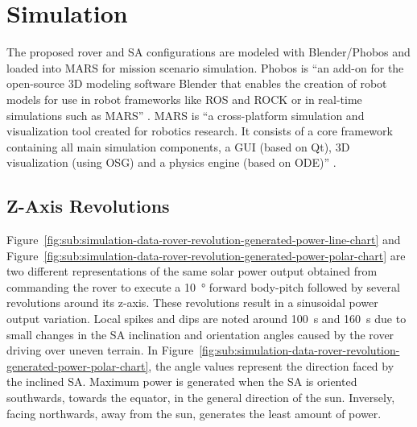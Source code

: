 \documentclass[twocolumn,letterpaper]{IEEEAerospaceCLS}  %
\newcommand{\refFig}[1]{{Figure}~\ref{#1}} %
\begin{document}
\section{Simulation}
The proposed rover and \ac{SA} configurations are modeled with Blender/Phobos and loaded into MARS for mission scenario simulation. Phobos is ``an add-on for the open-source 3D modeling software Blender that enables the creation of robot models for use in robot frameworks like ROS and ROCK or in real-time simulations such as MARS'' \cite{Phobos}. MARS is ``a cross-platform simulation and visualization tool created for robotics research. It consists of a core framework containing all main simulation components, a GUI (based on Qt), 3D visualization (using OSG) and a physics engine (based on ODE)'' \cite{MARSSim}.

\subsection{Z-Axis Revolutions}

\refFig{fig:sub:simulation-data-rover-revolution-generated-power-line-chart} and \refFig{fig:sub:simulation-data-rover-revolution-generated-power-polar-chart} are two different representations of the same solar power output obtained from commanding the rover to execute a \SI{10}{\degree} forward body-pitch followed by several revolutions around its z-axis. These revolutions result in a sinusoidal power output variation. Local spikes and dips are noted around \SI{100}{\second} and \SI{160}{\second} due to small changes in the \ac{SA} inclination and orientation angles caused by the rover driving over uneven terrain. In \refFig{fig:sub:simulation-data-rover-revolution-generated-power-polar-chart}, the angle values represent the direction faced by the inclined \ac{SA}. Maximum power is generated when the \ac{SA} is oriented southwards, towards the equator, in the general direction of the sun. Inversely, facing northwards, away from the sun, generates the least amount of power.
\end{document}
